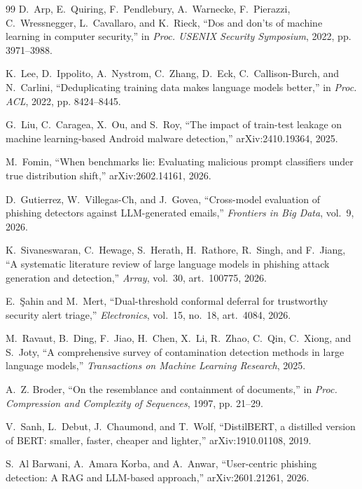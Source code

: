 \begin{thebibliography}{99}
D.~Arp, E.~Quiring, F.~Pendlebury, A.~Warnecke, F.~Pierazzi, C.~Wressnegger, L.~Cavallaro, and K.~Rieck, ``Dos and don'ts of machine learning in computer security,'' in \emph{Proc. USENIX Security Symposium}, 2022, pp. 3971--3988.

K.~Lee, D.~Ippolito, A.~Nystrom, C.~Zhang, D.~Eck, C.~Callison-Burch, and N.~Carlini, ``Deduplicating training data makes language models better,'' in \emph{Proc. ACL}, 2022, pp. 8424--8445.

G.~Liu, C.~Caragea, X.~Ou, and S.~Roy, ``The impact of train-test leakage on machine learning-based Android malware detection,'' arXiv:2410.19364, 2025.

M.~Fomin, ``When benchmarks lie: Evaluating malicious prompt classifiers under true distribution shift,'' arXiv:2602.14161, 2026.

D.~Gutierrez, W.~Villegas-Ch, and J.~Govea, ``Cross-model evaluation of phishing detectors against LLM-generated emails,'' \emph{Frontiers in Big Data}, vol.~9, 2026.

K.~Sivaneswaran, C.~Hewage, S.~Herath, H.~Rathore, R.~Singh, and F.~Jiang, ``A systematic literature review of large language models in phishing attack generation and detection,'' \emph{Array}, vol.~30, art.~100775, 2026.

E.~\c{S}ahin and M.~Mert, ``Dual-threshold conformal deferral for trustworthy security alert triage,'' \emph{Electronics}, vol.~15, no.~18, art.~4084, 2026.

M.~Ravaut, B.~Ding, F.~Jiao, H.~Chen, X.~Li, R.~Zhao, C.~Qin, C.~Xiong, and S.~Joty, ``A comprehensive survey of contamination detection methods in large language models,'' \emph{Transactions on Machine Learning Research}, 2025.

A.~Z. Broder, ``On the resemblance and containment of documents,'' in \emph{Proc. Compression and Complexity of Sequences}, 1997, pp. 21--29.

V.~Sanh, L.~Debut, J.~Chaumond, and T.~Wolf, ``DistilBERT, a distilled version of BERT: smaller, faster, cheaper and lighter,'' arXiv:1910.01108, 2019.

S.~Al Barwani, A.~Amara Korba, and A.~Anwar, ``User-centric phishing detection: A RAG and LLM-based approach,'' arXiv:2601.21261, 2026.

\end{thebibliography}
